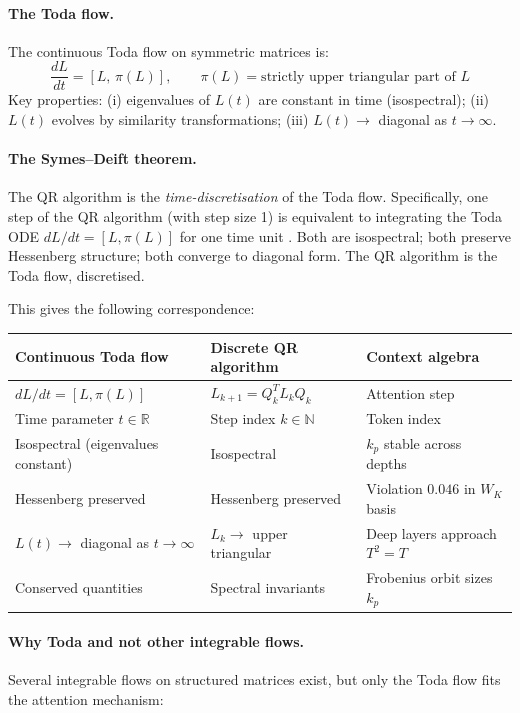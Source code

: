 \documentclass[11pt]{amsart}
\theoremstyle{definition}
\begin{document}
\paragraph{The Toda flow.}
The continuous Toda flow on symmetric matrices is:
\[
  \frac{dL}{dt} = [L,\, \pi(L)], \qquad
  \pi(L) = \text{strictly upper triangular part of }L
\]
Key properties: (i) eigenvalues of $L(t)$ are constant in time (isospectral);
(ii) $L(t)$ evolves by similarity transformations; (iii) $L(t) \to$ diagonal as $t\to\infty$.

\paragraph{The Symes--Deift theorem.}
The QR algorithm is the \emph{time-discretisation} of the Toda flow.
Specifically, one step of the QR algorithm (with step size 1) is equivalent
to integrating the Toda ODE $dL/dt = [L,\pi(L)]$ for one time unit
\cite{Moser75,Deift83}.
Both are isospectral; both preserve Hessenberg structure; both converge
to diagonal form.
The QR algorithm is the Toda flow, discretised.

This gives the following correspondence:

\begin{center}
\renewcommand{\arraystretch}{1.2}
\begin{tabular}{@{}lll@{}}
\toprule
Continuous Toda flow & Discrete QR algorithm & Context algebra \\
\midrule
$dL/dt = [L,\pi(L)]$ & $L_{k+1}=Q_k^T L_k Q_k$ & Attention step \\
Time parameter $t\in\mathbb{R}$ & Step index $k\in\mathbb{N}$ & Token index \\
Isospectral (eigenvalues constant) & Isospectral & $k_p$ stable across depths \\
Hessenberg preserved & Hessenberg preserved & Violation $0.046$ in $W_K$ basis \\
$L(t)\to$ diagonal as $t\to\infty$ & $L_k\to$ upper triangular & Deep layers approach $T^2=T$ \\
Conserved quantities & Spectral invariants & Frobenius orbit sizes $k_p$ \\
\bottomrule
\end{tabular}
\end{center}

\paragraph{Why Toda and not other integrable flows.}
Several integrable flows on structured matrices exist, but only the Toda flow
fits the attention mechanism:
\end{document}
